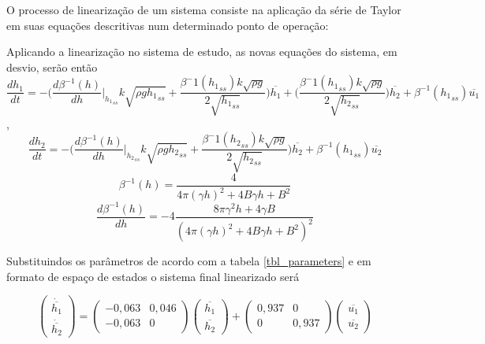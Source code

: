 O processo de linearização de um sistema consiste na aplicação da série de Taylor em suas equações descritivas num determinado ponto de operação:

Aplicando a linearização no sistema de estudo, as novas equações do sistema, em desvio, serão então
\begin{equation}
\frac{dh_1}{dt} = -\big(\frac{d\beta^{-1}(h)}{dh}\bigg|_{{h_1}_{ss}} k\sqrt{\rho g {h_1}_{ss}} + \frac{\beta^-1({h_1}_{ss}) k\sqrt{\rho g}}{2\sqrt{{h_1}_{ss}}}\big)\overline{h_1} + \big(\frac{\beta^-1({h_1}_{ss}) k\sqrt{\rho g}}{2\sqrt{{h_2}_{ss}}}\big)\overline{h_2} +  \beta^{-1}({h_1}_{ss})\overline{u_1}
\end{equation},
\begin{equation}
\frac{dh_2}{dt} = -\big(\frac{d\beta^{-1}(h)}{dh}\bigg|_{{h_2}_{ss}} k\sqrt{\rho g {h_2}_{ss}} + \frac{\beta^-1({h_2}_{ss}) k\sqrt{\rho g}}{2\sqrt{{h_2}_{ss}}}\big)\overline{h_2} + \beta^{-1}({h_1}_{ss})\overline{u_2}
\end{equation}
\begin{equation}
\beta^{-1}(h) = \frac{4}{4\pi(\gamma h)^2 + 4B\gamma h + B^2} 
\end{equation}
\begin{equation}
\frac{d\beta^{-1}(h)}{dh} = -4 \frac{8 \pi \gamma^2 h + 4 \gamma B}{(4\pi(\gamma h)^2 + 4B\gamma h + B^2)^2}
\end{equation}

Substituindos os parâmetros de acordo com a tabela \ref{tbl_parameters} e em formato de espaço de estados o sistema final linearizado será

\begin{equation}
\begin{pmatrix} \dot{\overline{h_1}} \\ \dot{\overline{h_2}} \end{pmatrix} = \begin{pmatrix} -0,063 & 0,046 \\ -0,063 & 0 \end{pmatrix} \begin{pmatrix} \overline{h_1} \\ \overline{h_2} \end{pmatrix} + \begin{pmatrix} 0,937 & 0 \\ 0 & 0,937 \end{pmatrix} \begin{pmatrix} \overline{u_1} \\ \overline{u_2} \end{pmatrix}
\label{espaco_estados}
\end{equation}

